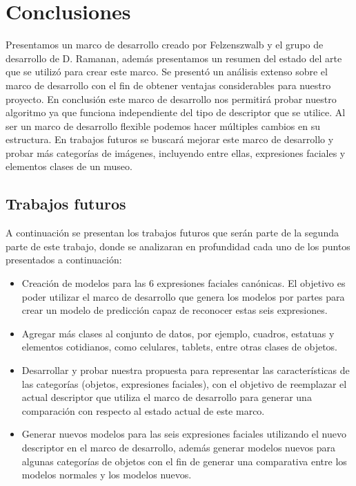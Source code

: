 \chapter[Conclusiones]{Conclusiones}\label{ch:capitulo7}
Presentamos un marco de desarrollo creado por Felzenszwalb y el grupo de desarrollo de D. Ramanan, además presentamos un resumen del estado del arte que se utilizó para crear este marco. Se presentó un análisis extenso sobre el marco de desarrollo con el fin de obtener ventajas considerables para nuestro proyecto. En conclusión este marco de desarrollo nos permitirá probar nuestro algoritmo ya que funciona independiente del tipo de descriptor que se utilice. Al ser un marco de desarrollo flexible podemos hacer múltiples cambios en su estructura. En trabajos futuros se buscará mejorar este marco de desarrollo y probar más categorías de imágenes, incluyendo entre ellas, expresiones faciales y elementos clases de un museo.

\section{Trabajos futuros}
A continuación se presentan los trabajos futuros que serán parte de la segunda parte de este trabajo, donde se analizaran en profundidad cada uno de los puntos presentados a continuación:
\begin{itemize}

\item Creación de modelos para las 6 expresiones faciales canónicas. El objetivo es poder utilizar el marco de desarrollo que genera los modelos por partes para crear un modelo de predicción capaz de reconocer estas seis expresiones.

\item Agregar más clases al conjunto de datos, por ejemplo, cuadros, estatuas y elementos cotidianos, como celulares, tablets, entre otras clases de objetos.

\item Desarrollar y probar nuestra propuesta para representar las características de las categorías (objetos, expresiones faciales), con el objetivo de reemplazar el actual descriptor que utiliza el marco de desarrollo para generar una comparación con respecto al estado actual de este marco.

\item Generar nuevos modelos para las seis expresiones faciales utilizando el nuevo descriptor en el marco de desarrollo, además generar modelos nuevos para algunas categorías de objetos con el fin de generar una comparativa entre los modelos normales y los modelos nuevos.

\end{itemize}